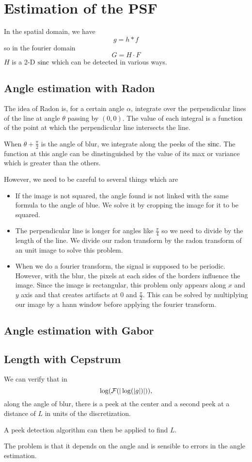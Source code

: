 \section{Estimation of the PSF}
In the spatial domain, we have
\[ g = h * f \]
so in the fourier domain
\[ G = H \cdot F \]
$H$ is a 2-D $\operatorname{sinc}$ which can be detected in
various ways.

\subsection{Angle estimation with Radon}
The idea of Radon is, for a certain angle $\alpha$,
integrate over the perpendicular lines of the line at
angle $\theta$ passing by $(0,0)$.
The value of each integral is a function of the
point at which the perpendicular line intersects the
line.

When $\theta+\frac{\pi}{2}$ is the angle of blur,
we integrate along the peeks of the $\operatorname{sinc}$.
The function at this angle can be dinstinguished
by the value of its max or variance which is
greater than the others.

However, we need to be careful to several things which
are
\begin{itemize}
  \item If the image is not squared, the angle found
    is not linked with the same formula to the angle
    of blue. We solve it by cropping the image for
    it to be squared.
  \item The perpendicular line is longer for angles
    like $\frac{\pi}{4}$ so we need to divide by
    the length of the line.
    We divide our radon transform by the
    radon transform of an unit image to solve
    this problem.
  \item When we do a fourier transform, the
    signal is supposed to be periodic.
    However, with the blur, the pixels at each
    sides of the borders influence the image.
    Since the image is rectangular, this
    problem only appears along $x$ and $y$ axis
    and that creates artifacts at $0$ and $\frac{\pi}{2}$.
    This can be solved by multiplying our image
    by a hann window before applying the
    fourier transform.
\end{itemize}

\subsection{Angle estimation with Gabor}

\subsection{Length with Cepstrum}
We can verify that in
\[ \log(\mathcal{F}(|\log(|g|)|)), \]
along the angle of blur,
there is a peek at the center and a second peek
at a distance of $L$ in units of the discretization.

A peek detection algorithm can then be applied
to find $L$.

The problem is that it depends on the angle
and is sensible to errors in the angle
estimation.
